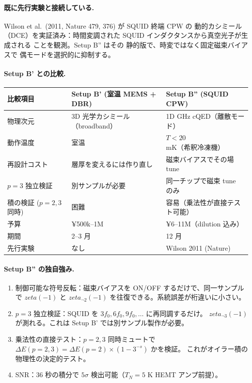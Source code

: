 \documentclass[11pt,a4paper]{article}
\def\zeta{zeta}%
\def\textbf#1{#1}%
\begin{document}
\paragraph{既に先行実験と接続している.}
Wilson et al.\ (2011, Nature 479, 376) が SQUID 終端 CPW の \textbf{動的}カシミール
（DCE）を実証済み：時間変調された SQUID インダクタンスから真空光子が生成される
ことを観測。Setup B'' はその \textbf{静的}版で、時変ではなく固定磁束バイアスで
偶モードを選択的に抑制する。

\paragraph{Setup B' との比較.}
\begin{center}
\begin{tabular}{lll}
\toprule
比較項目 & Setup B' (室温 MEMS + DBR) & \textbf{Setup B'' (SQUID CPW)} \\
\midrule
物理次元 & 3D 光学カシミール（broadband） & 1D GHz cQED（離散モード） \\
動作温度 & 室温 & $T < 20$ mK（希釈冷凍機） \\
再設計コスト & 層厚を変えるには作り直し & \textbf{磁束バイアスでその場 tune} \\
$p=3$ 独立検証 & 別サンプルが必要 & \textbf{同一チップで磁束 tune のみ} \\
積の検証 ($p=2, 3$ 同時) & 困難 & \textbf{容易}（乗法性が直接テスト可能） \\
予算 & ¥500k--1M & ¥6--11M（dilution 込み） \\
期間 & 2--3 月 & 12 月 \\
先行実験 & なし & Wilson 2011 (Nature) \\
\bottomrule
\end{tabular}
\end{center}

\paragraph{Setup B'' の独自強み.}
\begin{enumerate}
\item \textbf{制御可能な符号反転}：磁束バイアスを ON/OFF するだけで、同一サンプルで
  $\zeta(-1)$ と $\zeta_{\neg 2}(-1)$ を往復できる。系統誤差が桁違いに小さい。
\item \textbf{$p=3$ 独立検証}：SQUID を $3f_0, 6f_0, 9f_0, \ldots$ に再同調するだけ。
  $\zeta_{\neg 3}(-1)$ が測れる。これは Setup B' では別サンプル製作が必要。
\item \textbf{乗法性の直接テスト}：$p=2, 3$ 同時ミュートで
  $\Delta E(p{=}2,3) = \Delta E(p{=}2) \times (1 - 3^{-s})$ かを検証。
  これがオイラー積の物理性の決定的テスト。
\item \textbf{SNR}：36 秒の積分で $5\sigma$ 検出可能（$T_N = 5$ K HEMT アンプ前提）。
\end{enumerate}
\end{document}
